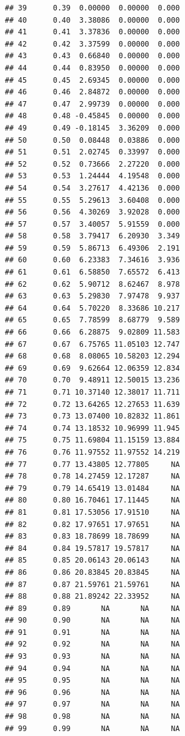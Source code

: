\documentclass{article}\usepackage[]{graphicx}\usepackage[]{color}
\makeatletter
\newenvironment{kframe}{%
 \def\at@end@of@kframe{}%
 \ifinner\ifhmode%
  \def\at@end@of@kframe{\end{minipage}}%
  \begin{minipage}{\columnwidth}%
 \fi\fi%
 \def\FrameCommand##1{\hskip\@totalleftmargin \hskip-\fboxsep
 \colorbox{shadecolor}{##1}\hskip-\fboxsep
     \hskip-\linewidth \hskip-\@totalleftmargin \hskip\columnwidth}%
 \MakeFramed {\advance\hsize-\width
   \@totalleftmargin\z@ \linewidth\hsize
   \@setminipage}}%
 {\par\unskip\endMakeFramed%
 \at@end@of@kframe}
\newenvironment{knitrout}{}{} %
\makeatother
\begin{document}
\begin{knitrout}
\begin{kframe}
\begin{verbatim}
## 39      0.39  0.00000  0.00000  0.000
## 40      0.40  3.38086  0.00000  0.000
## 41      0.41  3.37836  0.00000  0.000
## 42      0.42  3.37599  0.00000  0.000
## 43      0.43  0.66840  0.00000  0.000
## 44      0.44  0.83950  0.00000  0.000
## 45      0.45  2.69345  0.00000  0.000
## 46      0.46  2.84872  0.00000  0.000
## 47      0.47  2.99739  0.00000  0.000
## 48      0.48 -0.45845  0.00000  0.000
## 49      0.49 -0.18145  3.36209  0.000
## 50      0.50  0.08448  0.03886  0.000
## 51      0.51  2.02745  0.33997  0.000
## 52      0.52  0.73666  2.27220  0.000
## 53      0.53  1.24444  4.19548  0.000
## 54      0.54  3.27617  4.42136  0.000
## 55      0.55  5.29613  3.60408  0.000
## 56      0.56  4.30269  3.92028  0.000
## 57      0.57  3.40057  5.91559  0.000
## 58      0.58  3.79417  6.20930  3.349
## 59      0.59  5.86713  6.49306  2.191
## 60      0.60  6.23383  7.34616  3.936
## 61      0.61  6.58850  7.65572  6.413
## 62      0.62  5.90712  8.62467  8.978
## 63      0.63  5.29830  7.97478  9.937
## 64      0.64  5.70220  8.33686 10.217
## 65      0.65  7.78599  8.68779  9.589
## 66      0.66  6.28875  9.02809 11.583
## 67      0.67  6.75765 11.05103 12.747
## 68      0.68  8.08065 10.58203 12.294
## 69      0.69  9.62664 12.06359 12.834
## 70      0.70  9.48911 12.50015 13.236
## 71      0.71 10.37140 12.38017 11.711
## 72      0.72 13.64265 12.27653 11.639
## 73      0.73 13.07400 10.82832 11.861
## 74      0.74 13.18532 10.96999 11.945
## 75      0.75 11.69804 11.15159 13.884
## 76      0.76 11.97552 11.97552 14.219
## 77      0.77 13.43805 12.77805     NA
## 78      0.78 14.27459 12.17287     NA
## 79      0.79 14.65419 13.01484     NA
## 80      0.80 16.70461 17.11445     NA
## 81      0.81 17.53056 17.91510     NA
## 82      0.82 17.97651 17.97651     NA
## 83      0.83 18.78699 18.78699     NA
## 84      0.84 19.57817 19.57817     NA
## 85      0.85 20.06143 20.06143     NA
## 86      0.86 20.83845 20.83845     NA
## 87      0.87 21.59761 21.59761     NA
## 88      0.88 21.89242 22.33952     NA
## 89      0.89       NA       NA     NA
## 90      0.90       NA       NA     NA
## 91      0.91       NA       NA     NA
## 92      0.92       NA       NA     NA
## 93      0.93       NA       NA     NA
## 94      0.94       NA       NA     NA
## 95      0.95       NA       NA     NA
## 96      0.96       NA       NA     NA
## 97      0.97       NA       NA     NA
## 98      0.98       NA       NA     NA
## 99      0.99       NA       NA     NA
\end{verbatim}
\begin{alltt}

\end{alltt}
\end{kframe}
\end{knitrout}
\end{document}
